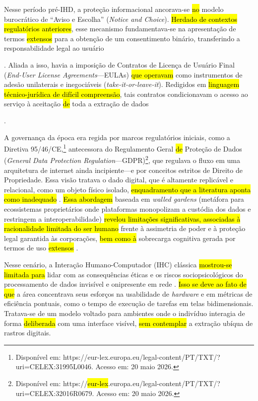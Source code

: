 \documentclass[12pt]{article}
\newcommand{\hlcite}[1]{\colorbox{yellow}{\cite{#1}}} %
\begin{document}
    Nesse período pré-IHD, a proteção informacional ancorava-se \hl{no} modelo burocrático de ``Aviso e Escolha'' (\textit{Notice and Choice}). \hl{Herdado de contextos regulatórios anteriores}, esse mecanismo fundamentava-se na apresentação de termos \hl{extensos} para a obtenção de um consentimento binário, transferindo a responsabilidade legal ao usuário {\hlcite{Jones2017}. Aliada a isso, havia a imposição de Contratos de Licença de Usuário Final (\textit{End-User License Agreements}---EULAs) \hl{que operavam} como instrumentos de adesão unilaterais e inegociáveis (\textit{take-it-or-leave-it}). Redigidos em \hl{linguagem técnico-jurídica de difícil compreensão}, tais contratos condicionavam o acesso ao serviço à aceitação \hl{de} toda a extração de dados {\hlcite{Hutton2017}.

    A governança da época era regida por marcos regulatórios iniciais, como a Diretiva 95/46/CE,\footnote{Disponível em: https://eur-lex.europa.eu/legal-content/PT/TXT/?uri=CELEX:31995L0046. Acesso em: 20 maio 2026.} antecessora do Regulamento Geral \hl{de} Proteção de Dados (\textit{General Data Protection Regulation}---GDPR)\footnote{Disponível em: https://\hl{eur-lex}.europa.eu/legal-content/PT/TXT/?uri=CELEX:32016R0679. Acesso em: 20 maio 2026.}, que regulava o fluxo em uma arquitetura de internet ainda incipiente---e por conceitos estritos de Direito de Propriedade. Essa visão tratava o dado digital, que é altamente replicável e relacional, como um objeto físico isolado, \hl{enquadramento que a literatura aponta como inadequado} \cite{malgieri2019automated, janecek2018ownership}. \hl{Essa abordagem} baseada em \textit{walled gardens} (metáfora para ecossistemas proprietários onde plataformas monopolizam a custódia dos dados e restringem a interoperabilidade) \hlcite{Turkay2021, Xiao2021} \hl{revelou limitações significativas, associadas à racionalidade limitada do ser humano} frente à assimetria de poder e à proteção legal garantida às corporações, \hl{bem como à} sobrecarga cognitiva gerada por termos de uso \hl{extensos} \cite{malgieri2020vulnerable, DOWTHWAITE2024, chalhoub2024useful}.
    
    Nesse cenário, a Interação Humano-Computador (IHC) clássica \hl{mostrou-se limitada para} lidar com as consequências éticas e os riscos sociopsicológicos do processamento de dados invisível e onipresente em rede \hlcite{Parviainen2016, Calvetti2021173}. \hl{Isso se deve ao fato de que} a área concentrava seus esforços na usabilidade de \textit{hardware} e em métricas de eficiência pontuais, como o tempo de execução de tarefas em telas bidimensionais. Tratava-se de um modelo voltado para ambientes onde o indivíduo interagia de forma \hl{deliberada} com uma interface visível, \hl{sem contemplar} a extração ubíqua de rastros digitais.

}}
\end{document}
